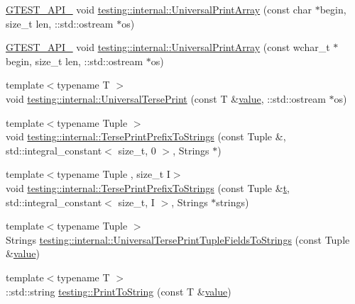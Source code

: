 \begin{DoxyCompactItemize}
\item 
\mbox{\hyperlink{_obj__test_2lib_2googletest-release-1_88_81_2googletest_2include_2gtest_2internal_2gtest-port_8h_aa73be6f0ba4a7456180a94904ce17790}{G\+T\+E\+S\+T\+\_\+\+A\+P\+I\+\_\+}} void \mbox{\hyperlink{namespacetesting_1_1internal_a72c997dbd2c562110b2cb56c359decfa}{testing\+::internal\+::\+Universal\+Print\+Array}} (const char $\ast$begin, size\+\_\+t len, \+::std\+::ostream $\ast$os)
\item 
\mbox{\hyperlink{_obj__test_2lib_2googletest-release-1_88_81_2googletest_2include_2gtest_2internal_2gtest-port_8h_aa73be6f0ba4a7456180a94904ce17790}{G\+T\+E\+S\+T\+\_\+\+A\+P\+I\+\_\+}} void \mbox{\hyperlink{namespacetesting_1_1internal_ae31e146c35fd75afc6a9cc73ae2692d1}{testing\+::internal\+::\+Universal\+Print\+Array}} (const wchar\+\_\+t $\ast$begin, size\+\_\+t len, \+::std\+::ostream $\ast$os)
\item 
{\footnotesize template$<$typename T $>$ }\\void \mbox{\hyperlink{namespacetesting_1_1internal_afa92f5a284929dc3723e654a25feb7b9}{testing\+::internal\+::\+Universal\+Terse\+Print}} (const T \&\mbox{\hyperlink{_obj__test_2lib_2googletest-master_2googlemock_2test_2gmock-matchers__test_8cc_a337b8a670efc0b086ad3af163f3121b6}{value}}, \+::std\+::ostream $\ast$os)
\item 
{\footnotesize template$<$typename Tuple $>$ }\\void \mbox{\hyperlink{namespacetesting_1_1internal_a6300aa1440d0019cf08d9a1f6efd4382}{testing\+::internal\+::\+Terse\+Print\+Prefix\+To\+Strings}} (const Tuple \&, std\+::integral\+\_\+constant$<$ size\+\_\+t, 0 $>$, Strings $\ast$)
\item 
{\footnotesize template$<$typename Tuple , size\+\_\+t I$>$ }\\void \mbox{\hyperlink{namespacetesting_1_1internal_ab244273c02742a3fac45cc241befc536}{testing\+::internal\+::\+Terse\+Print\+Prefix\+To\+Strings}} (const Tuple \&\mbox{\hyperlink{_mutual_8h_a978d88b393c8a37dc2614c88788b3442}{t}}, std\+::integral\+\_\+constant$<$ size\+\_\+t, I $>$, Strings $\ast$strings)
\item 
{\footnotesize template$<$typename Tuple $>$ }\\Strings \mbox{\hyperlink{namespacetesting_1_1internal_a7e60d1478b074801c766eeee9be6c772}{testing\+::internal\+::\+Universal\+Terse\+Print\+Tuple\+Fields\+To\+Strings}} (const Tuple \&\mbox{\hyperlink{_obj__test_2lib_2googletest-master_2googlemock_2test_2gmock-matchers__test_8cc_a337b8a670efc0b086ad3af163f3121b6}{value}})
\item 
{\footnotesize template$<$typename T $>$ }\\\+::std\+::string \mbox{\hyperlink{namespacetesting_aa5717bb1144edd1d262d310ba70c82ed}{testing\+::\+Print\+To\+String}} (const T \&\mbox{\hyperlink{_obj__test_2lib_2googletest-master_2googlemock_2test_2gmock-matchers__test_8cc_a337b8a670efc0b086ad3af163f3121b6}{value}})
\end{DoxyCompactItemize}



